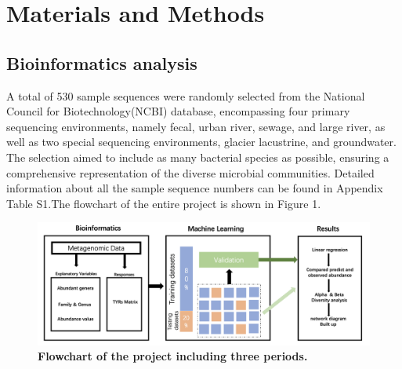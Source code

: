 \documentclass[12pt]{article}
\begin{document}
\section{Materials and Methods}

\subsection{Bioinformatics analysis}

A total of 530 sample sequences were randomly selected from the National Council for Biotechnology(NCBI) database, encompassing four primary sequencing environments, namely fecal, urban river, sewage, and large river, as well as two special sequencing environments, glacier lacustrine, and groundwater. The selection aimed to include as many bacterial species as possible, ensuring a comprehensive representation of the diverse microbial communities. Detailed information about all the sample sequence numbers can be found in Appendix Table S1.The flowchart of the entire project is shown in Figure 1.
\begin{figure}[H]
    \centering
    \includegraphics[width=1\linewidth]{pic/flowwork.png} 
    \caption{\small\bfseries Flowchart of the project including three periods.}
\end{figure}
\end{document}
